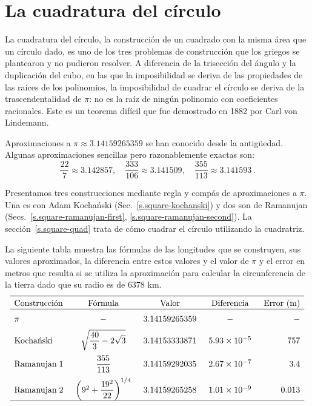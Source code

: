 
\chapter{La cuadratura del círculo}\label{c.square}


La cuadratura del círculo, la construcción de un cuadrado con la misma área que un círculo dado, es uno de los tres problemas de construcción que los griegos se plantearon y no pudieron resolver. A diferencia de la trisección del ángulo y la duplicación del cubo, en las que la imposibilidad se deriva de las propiedades de las raíces de los polinomios, la imposibilidad de cuadrar el círculo se deriva de la trascendentalidad de $\pi$: no es la raíz de ningún polinomio con coeficientes racionales. Este es un teorema difícil que fue demostrado en 1882 por Carl von Lindemann.

Aproximaciones a $\pi\approx 3.14159265359$ se han conocido desde la antigüedad. Algunas aproximaciones sencillas pero razonablemente exactas son:
\[
\displaystyle\frac{22}{7}\approx 3.142857,\quad \displaystyle\frac{333}{106}\approx 3.141509,\quad \displaystyle\frac{355}{113}\approx 3.141593\,.
\]

Presentamos tres construcciones mediante regla y compás de aproximaciones a $\pi$. Una es con Adam Kocha\'{n}ski (Sec.~\ref{s.square-kochanski}) y dos son de Ramanujan (Secs.~\ref{s.square-ramanujan-first}, \ref{s.square-ramanujan-second}). La sección~\ref{s.square-quad} trata de cómo cuadrar el círculo utilizando la cuadratriz.

La siguiente tabla muestra las fórmulas de las longitudes que se construyen, sus valores aproximados, la diferencia entre estos valores y el valor de $\pi$ y el error en metros que resulta si se utiliza la aproximación para calcular la circunferencia de la tierra dado que su radio es de $6378$ km.
\[
\begin{array}{l@{\hspace{5mm}}c@{\hspace{5mm}}c@{\hspace{5mm}}c@{\hspace{5mm}}r}
\hline\noalign{\smallskip}
\textrm{Construcción} & \textrm{Fórmula} &\textrm{Valor} & \textrm{Diferencia} & \textrm{Error (m)}\\\hline\noalign{\medskip}
\pi & -& 3.14159265359 & - & -\\\noalign{\medskip}
\textrm{Kocha\'{n}ski} & \sqrt{\displaystyle\frac{40}{3}-2\sqrt{3}}&
  3.14153333871 & 5.93 \times 10^{-5} & 757\\\noalign{\medskip}
\textrm{Ramanujan}\; 1 & \displaystyle\frac{355}{113} &
  3.14159292035 &2.67  \times 10^{-7}&3.4\\\noalign{\medskip}
\textrm{Ramanujan}\; 2 &\left(9^2+\displaystyle\frac{19^2}{22}\right)^{1/4}&
  3.14159265258 & 1.01 \times 10^{-9}& 0.013\\
\hline\noalign{\smallskip}
\end{array}
\]


